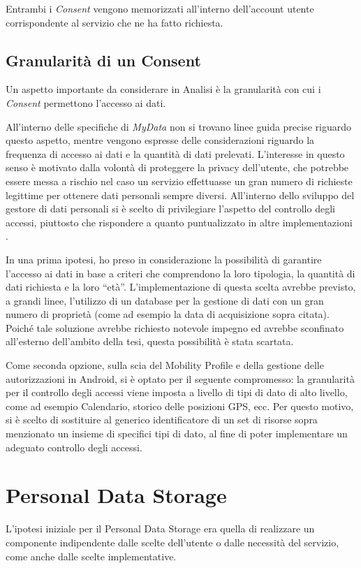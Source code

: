Entrambi i \textit{Consent} vengono memorizzati all’interno dell’account utente corrispondente al servizio che ne ha fatto richiesta.

\subsection{Granularit\`a di un Consent}
\label{subsec:A-granularitaConsent}
Un aspetto importante da considerare in Analisi \`e la granularit\`a con cui i \textit{Consent} permettono l’accesso ai dati. 

All’interno delle specifiche di \textit{MyData} non si trovano linee guida precise riguardo questo aspetto, mentre vengono espresse delle considerazioni riguardo la frequenza di accesso ai dati e la quantit\`a di dati prelevati. L’interesse in questo senso \`e motivato dalla volont\`a di proteggere la privacy dell’utente, che potrebbe essere messa a rischio nel caso un servizio effettuasse un gran numero di richieste legittime per ottenere dati personali sempre diversi. All’interno dello sviluppo del gestore di dati personali si \`e scelto di privilegiare l’aspetto del controllo degli accessi, piuttosto che rispondere a quanto puntualizzato in altre implementazioni \cite{githubmobilityprofile}.

In una prima ipotesi, ho preso in considerazione la possibilit\`a di garantire l’accesso ai dati in base a criteri che comprendono la loro tipologia, la quantit\`a di dati richiesta e la loro “et\`a”. L’implementazione di questa scelta avrebbe previsto, a grandi linee, l’utilizzo di un database per la gestione di dati con un gran numero di propriet\`a (come ad esempio la data di acquisizione sopra citata). Poich\'e tale soluzione avrebbe richiesto notevole impegno ed avrebbe sconfinato all’esterno dell’ambito della tesi, questa possibilit\`a \`e stata scartata.

Come seconda opzione, sulla scia del Mobility Profile e della gestione delle autorizzazioni in Android, si \`e optato per il seguente compromesso: la granularit\`a per il controllo degli accessi viene imposta a livello di tipi di dato di alto livello, come ad esempio Calendario, storico delle posizioni GPS, ecc. Per questo motivo, si \`e scelto di sostituire al generico identificatore di un set di risorse sopra menzionato un insieme di specifici tipi di dato, al fine di poter implementare un adeguato controllo degli accessi.

\section{Personal Data Storage}
\label{sec:A-PDS}
L’ipotesi iniziale per il Personal Data Storage era quella di realizzare un componente indipendente dalle scelte dell’utente o dalle necessit\`a del servizio, come anche dalle scelte implementative. 

